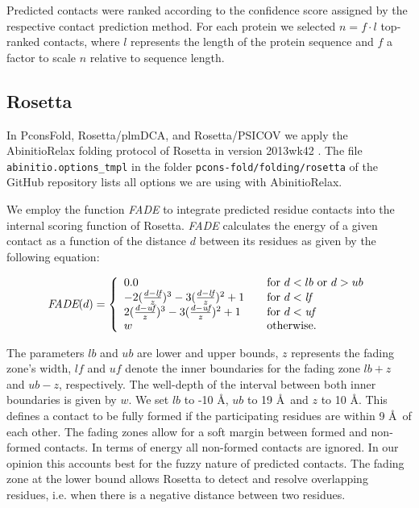 \documentclass{bioinfo}
\begin{document}
\begin{methods}
Predicted contacts were ranked according to the confidence score
assigned by the respective contact prediction method. For each protein
we selected $n = f \cdot l$ top-ranked contacts, where $l$ represents
the length of the protein sequence and $f$ a factor to scale $n$
relative to sequence length.



\subsection{Rosetta}
In PconsFold, Rosetta/plmDCA, and Rosetta/PSICOV we apply the
AbinitioRelax folding protocol \cite[]{rohl_protein_2004} of Rosetta
in version 2013wk42 \cite[]{leaver-fay_rosetta3:_2011}. The file {\tt
 abinitio.options\_tmpl} in the folder {\tt pcons-fold/folding/rosetta} of the GitHub
repository lists all options we are using with AbinitioRelax. 

We employ the function \emph{FADE} to integrate predicted residue
contacts into the internal scoring function of Rosetta. \emph{FADE}
calculates the energy of a given contact as a function of the distance
$d$ between its residues as given by the following equation:

\begin{equation}%
\textit{FADE}(d) = \left\{
\begin{array}{l l l}\label{eq:fade}
0.0 & \quad \textrm{for $d < lb$ or $d > ub$} \\
-2(\frac{d - \textit{lf}}{z})^3 - 3(\frac{d - \textit{lf}}{z})^2 + 1 & \quad \textrm{for $d < \textit{lf}$} \\
2(\frac{d - \textit{uf}}{z})^3 - 3(\frac{d - \textit{uf}}{z})^2 + 1 & \quad \textrm{for $d < \textit{uf}$} \\
w & \quad \textrm{otherwise.} \\
\end{array} \right.
\end{equation}

The parameters $lb$ and $ub$ are lower and upper bounds, $z$
represents the fading zone's width, $\textit{lf}$ and $\textit{uf}$
denote the inner boundaries for the fading zone $lb + z$ and $ub - z$,
respectively. The well-depth of the interval between both inner
boundaries is given by $w$. We set $lb$ to -10 \AA, $ub$ to 19 \AA\
and $z$ to 10 \AA. This defines a contact to be fully formed if the
participating residues are within 9 \AA\ of each other. The fading
zones allow for a soft margin between formed and non-formed
contacts. In terms of energy all non-formed contacts are ignored. In
our opinion this accounts best for the fuzzy nature of predicted
contacts. The fading zone at the lower bound allows Rosetta to detect
and resolve overlapping residues, i.e. when there is a negative
distance between two residues. 


\end{methods}
\end{document}
